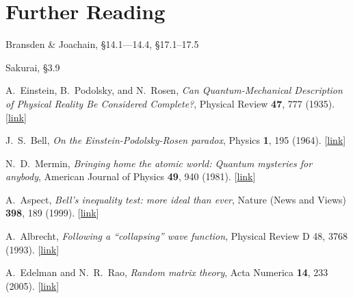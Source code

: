 \documentclass[pra,12pt]{revtex4}
\begin{document}
\section*{Further Reading}

\begin{enumerate}[[1{]}]
\item Bransden \& Joachain, \S14.1---14.4, \S17.1--17.5

\item Sakurai, \S3.9

\item A.~Einstein, B.~Podolsky, and N.~Rosen,
  \textit{Can Quantum-Mechanical Description of Physical Reality Be
    Considered Complete?}, Physical Review \textbf{47}, 777 (1935).
  [\href{https://journals.aps.org/pr/abstract/10.1103/PhysRev.47.777}{link}]
  \label{cite:epr}

\item J.~S.~Bell, \textit{On the Einstein-Podolsky-Rosen paradox},
  Physics \textbf{1}, 195 (1964). [\href{http://inspirehep.net/record/31657/files/}{link}]\label{cite:bell}
  
\item N.~D.~Mermin, \textit{Bringing home the atomic world: Quantum
  mysteries for anybody}, American Journal of Physics \textbf{49}, 940
  (1981). [\href{http://aapt.scitation.org/doi/abs/10.1119/1.12594}{link}] \label{cite:mermin}

\item A.~Aspect, \textit{Bell's inequality test: more ideal than ever},
  Nature (News and Views) \textbf{398}, 189 (1999). [\href{https://www.nature.com/articles/18296}{link}] \label{cite:aspect}

\item A.~Albrecht, \textit{Following a ``collapsing'' wave function},
  Physical Review D \textrm{48}, 3768 (1993). [\href{https://journals.aps.org/prd/abstract/10.1103/PhysRevD.48.3768}{link}]
\label{cite:albrecht}

\item A.~Edelman and N.~R.~Rao, \textit{Random matrix theory}, Acta
  Numerica \textbf{14}, 233 (2005). [\href{https://doi.org/10.1017/S0962492904000236}{link}]
\label{cite:edelman}
\end{enumerate}
\end{document}
